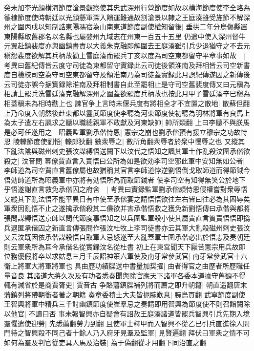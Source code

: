 癸未加李光顔横海節度滄景觀察使其忠武深州行營節度如故以横海節度使李全略為德棣節度使時朝廷以光顔懸軍深入饋運難通故割滄景以隸之王庭湊雖受旌節不解深州之圍丙戌以知制誥東陽馮宿為山南東道節度副使權知留後|{
	垂拱二年分烏傷縣置東陽縣取舊郡名以名縣也屬婺州九域志在州東一百五十五里}
仍遣中使入深州督牛元翼赴鎮裴度亦與幽鎮書責以大義朱克融即解圍去王庭湊雖引兵少退猶守之不去元稹怨裴度欲解其兵柄故勸上雪庭湊而罷兵丁亥以度為司空東都留守平章事如故　|{
	考異曰舊紀傳皆云度守司徒為東都留守實録此云司徒後領淮南及拜相皆云司空新書度自檢校司空為守司空東都留守及領淮南乃為司徒蓋實録此月誤紀傳遂因之新傳後云司徒亦誤今据實録除淮南及拜相制書自此至罷相止是守司空舊裴度傳又曰元稹為相請上罷兵洗雪廷湊克融解深州之圍蓋欲罷度兵柄故也按此月甲子雪廷湊辛巳稹為相蓋稹未為相時勸上也}
諫官争上言時未偃兵度有將相全才不宜置之散地|{
	散蘇但翻}
上乃命度入朝然後赴東都以靈武節度使李聽為河東節度使初聽為羽林將軍有良馬上為太子遣左右諷求之聽以職總親軍不敢獻及河東缺帥|{
	帥所類翻}
上曰李聽不與朕馬是必可任遂用之　昭義監軍劉承偕恃恩|{
	憲宗之崩也劉承偕預有援立穆宗之功故恃恩}
陵轢節度使劉悟|{
	轢郎狄翻}
數衆辱之|{
	數所角翻衆辱者於衆中慢辱之也}
又縱其下亂法隂與磁州刺史張汶謀縛悟送闕下以汶代之悟知之諷其軍士作亂殺汶圍承偕欲殺之|{
	汶音問}
幕僚賈直言入責悟曰公所為如是欲効李司空邪此軍中安知無如公者|{
	李師道為司空賈直言舊僚屬也故猶稱其官言李師道悖逆劉悟倒戈取師道而得節鉞今悟効師道所為昭義軍中亦將有効悟所為而取節鉞者}
使李司空有知得無笑公於地下乎悟遂謝直言救免承偕囚之府舍　|{
	考異曰實録監軍劉承偕頗恃恩侵權嘗對衆辱悟又縱其下亂法悟不能平異日有中使至承偕宴之請悟悟欲往左右皆曰往必為其困辱矣軍衆因亂悟不止之遂擒承偕殺其二傔欲并害承偕悟救之獲免新劉悟傳曰承偕與都將張問謀縛悟送京師以問代節度事悟知之以兵圍監軍殺小使其屬賈直言質責悟悟即撝兵退匿承偕囚之新直言傳張問作張汶杜牧上李司徒書亦云其軍大亂殺磁州刺史張汶又云汶既因依承偕謀殺悟自取軍人忌怒遂至大亂蓋軍士圍承偕必出於悟志及奏朝廷則云軍衆所為耳今承偕名從實録汶名從杜書}
初上在東宫聞天下厭苦憲宗用兵故即位務優假將卒以求姑息三月壬辰詔神策六軍使及南牙常參武官|{
	南牙常參武官十六衛上將軍大將軍將軍也}
具由歷功績牒送中書量加奨擢|{
	由者得官之由歷者所歷職任量音良}
其諸道大將久次及有功者悉奏聞與除官應天下諸軍各委本道據守舊額不得輒有減省於是商賈胥吏|{
	賈音古}
争賂藩鎮牒補列將而薦之即升朝籍|{
	朝直遥翻唐末藩鎮列將帶朝銜者著之朝籍}
奏章委積士大夫皆扼腕歎息|{
	腕烏貫翻}
武寧節度副使王智興將軍中精兵三千討幽鎮節度使崔羣忌之奏請即用智興為節度使不則召詣闕除以他官|{
	不讀曰否}
事未報智興亦自疑會有詔赦王庭湊諸道皆罷兵智興引兵先期入境羣懼遣使迎勞|{
	先悉薦翻勞力到翻}
且使軍士釋甲而入智興不從乙巳引兵直進徐人開門待之智興殺不同己者十餘人乃入府牙見羣及監軍|{
	見賢遍翻}
拜伏曰軍衆之情不可如何為羣及判官從吏具人馬及治裝|{
	為于偽翻從才用翻下同治直之翻}
